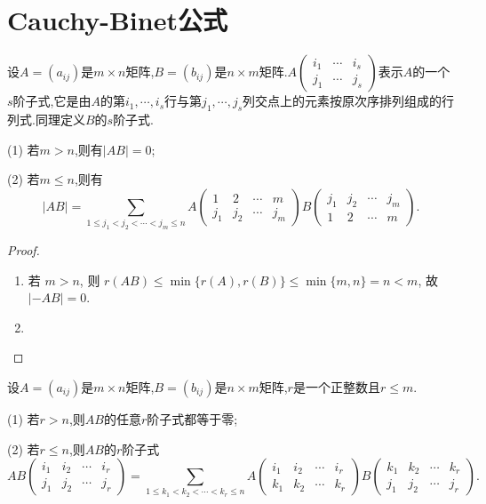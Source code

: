 \documentclass[../../main.tex]{subfiles}
\begin{document}
\section{Cauchy-Binet公式}

\begin{theorem}\label{theorem:Cauchy-Binet公式}
设\(A=(a_{ij})\)是\(m\times n\)矩阵,\(B=(b_{ij})\)是\(n\times m\)矩阵.\(A\left(\begin{matrix}
i_1 & \cdots & i_s\\
j_1 & \cdots & j_s
\end{matrix}\right)\)表示\(A\)的一个\(s\)阶子式,它是由\(A\)的第\(i_1,\cdots,i_s\)行与第\(j_1,\cdots,j_s\)列交点上的元素按原次序排列组成的行列式.同理定义\(B\)的\(s\)阶子式.

(1) 若\(m > n\),则有\(\vert AB\vert=0\);

(2) 若\(m\leq n\),则有
\[\vert AB\vert=\sum_{1\leq j_1<j_2<\cdots<j_m\leq n}A\left(\begin{matrix}
1 & 2 & \cdots & m\\
j_1 & j_2 & \cdots & j_m
\end{matrix}\right)B\left(\begin{matrix}
j_1 & j_2 & \cdots & j_m\\
1 & 2 & \cdots & m
\end{matrix}\right).\]
\end{theorem}
\begin{proof}
\begin{enumerate}[(1)]
\item 若 \(m > n\), 则 \(r(AB) \leq \min\{r(A), r(B)\} \leq \min\{m, n\} = n < m\), 故 \(|-AB| = 0\).

\item 
\end{enumerate}
\end{proof}

\begin{corollary}\label{corollary:Cauchy-Binet公式推论}
设\(A=(a_{ij})\)是\(m\times n\)矩阵,\(B=(b_{ij})\)是\(n\times m\)矩阵,\(r\)是一个正整数且\(r\leq m\).

(1) 若\(r > n\),则\(AB\)的任意\(r\)阶子式都等于零;

(2) 若\(r\leq n\),则\(AB\)的\(r\)阶子式
\[AB\left(\begin{matrix}
i_1 & i_2 & \cdots & i_r\\
j_1 & j_2 & \cdots & j_r
\end{matrix}\right)=\sum_{1\leq k_1<k_2<\cdots<k_r\leq n}A\left(\begin{matrix}
i_1 & i_2 & \cdots & i_r\\
k_1 & k_2 & \cdots & k_r
\end{matrix}\right)B\left(\begin{matrix}
k_1 & k_2 & \cdots & k_r\\
j_1 & j_2 & \cdots & j_r
\end{matrix}\right).\]
\end{corollary}
\end{document}
